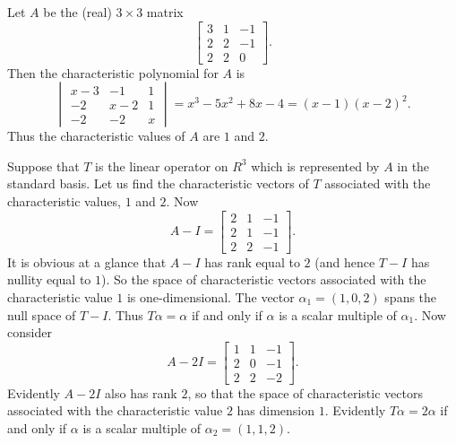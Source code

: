 \begin{example}\label{example:6.2}
    Let \(A\) be the (real) \(3\times3\) matrix
    \begin{equation*}
        \begin{bmatrix}
            3 & 1 & -1 \\
            2 & 2 & -1 \\
            2 & 2 & 0
        \end{bmatrix}
        .
    \end{equation*}
    Then the characteristic polynomial for \(A\) is
    \begin{equation*}
        \begin{vmatrix}
            x-3 & -1 & 1 \\
            -2 & x-2 & 1 \\
            -2 & -2 & x
        \end{vmatrix}
        =x^3-5x^2+8x-4=\left(x-1\right)\left(x-2\right)^2.
    \end{equation*}
    Thus the characteristic values of \(A\) are \(1\) and \(2\).
    
    Suppose that \(T\) is the linear operator on \(R^3\) which is represented by \(A\) in the standard basis. Let us find the characteristic vectors of \(T\) associated with the characteristic values, \(1\) and \(2\). Now
    \begin{equation*}
        A-I=
        \begin{bmatrix}
            2 & 1 & -1 \\
            2 & 1 & -1 \\
            2 & 2 & -1
        \end{bmatrix}
        .
    \end{equation*}
    It is obvious at a glance that \(A-I\) has rank equal to \(2\) (and hence \(T-I\) has nullity equal to \(1\)). So the space of characteristic vectors associated with the characteristic value \(1\) is one-dimensional. The vector \(\alpha_1=\left(1,0,2\right)\) spans the null space of \(T-I\). Thus \(T\alpha=\alpha\) if and only if \(\alpha\) is a scalar multiple of \(\alpha_1\). Now consider
    \begin{equation*}
        A-2I=
        \begin{bmatrix}
            1 & 1 & -1 \\
            2 & 0 & -1 \\
            2 & 2 & -2
        \end{bmatrix}
        .
    \end{equation*}
    Evidently \(A-2I\) also has rank \(2\), so that the space of characteristic vectors associated with the characteristic value \(2\) has dimension \(1\). Evidently \(T\alpha=2\alpha\) if and only if \(\alpha\) is a scalar multiple of \(\alpha_2=\left(1,1,2\right)\).
\end{example}

